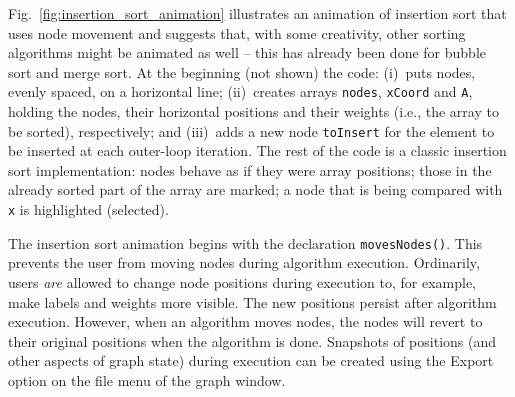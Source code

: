 

Fig.~\ref{fig:insertion_sort_animation}
illustrates an animation of insertion sort
that uses node movement and suggests that, with some creativity,
other sorting algorithms might be animated as well
-- this has already been done for bubble sort and merge sort.
At the beginning (not shown) the code:
(i)~puts nodes, evenly spaced, on a horizontal line;
(ii)~creates arrays \verb$nodes$, \verb$xCoord$ and \verb$A$, holding the
nodes, their horizontal positions and their weights (i.e., the array to be sorted), respectively; and (iii)~adds a new node \verb$toInsert$ for the
element to be inserted at each outer-loop iteration.
The rest of the code is a classic insertion sort implementation: nodes behave
as if they were array positions; those in the already sorted part of the array
are marked; a node that is being compared with \verb$x$ is highlighted (selected).

The insertion sort animation begins with the declaration
\verb+movesNodes()+.
This prevents the user from moving nodes during algorithm execution.
Ordinarily, users \emph{are} allowed to change node positions during execution
to, for example, make labels and weights more visible.
The new positions persist after algorithm execution.
However, when an algorithm moves nodes, the nodes will revert to their original
positions when the algorithm is done.
Snapshots of positions (and other aspects of graph state)
during execution can be created using the
\textsf{Export} option on the file menu of the graph window.

